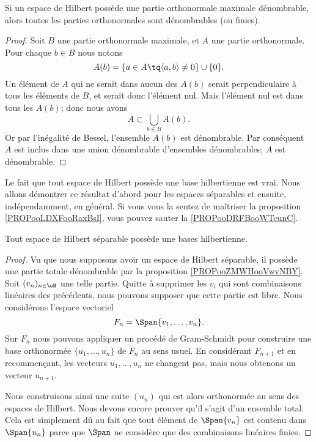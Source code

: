 \begin{proposition}      \label{PROPooENTIooIplRAS}
    Si un espace de Hilbert possède une partie orthonormale maximale dénombrable, alors toutes les parties orthonormales sont dénombrables (ou finies).
\end{proposition}

\begin{proof}
    Soit \( B\) une partie orthonormale maximale, et \( A\) une partie orthonormale. Pour chaque \( b\in B\) nous notons
    \begin{equation}
        A(b)=\{ a\in A\tq \langle a, b\rangle \neq 0 \}\cup\{ 0 \}.
    \end{equation}
    Un élément de \( A\) qui ne serait dans aucun des \( A(b)\) serait perpendiculaire à tous les éléments de \( B\), et serait donc l'élément nul. Mais l'élément nul est dans tous les \( A(b)\); donc nous avons
    \begin{equation}
        A\subset\bigcup_{b\in B}A(b).
    \end{equation}
    Or par l'inégalité de Bessel, l'ensemble \( A(b)\) est dénombrable. Par conséquent \( A\) est inclus dans une union dénombrable d'ensembles dénombrables; \( A\) est dénombrable.
\end{proof}

Le fait que tout espace de Hilbert possède une base hilbertienne est vrai. Nous allons démontrer ce résultat d'abord pour les espaces séparables et ensuite, indépendamment, en général. Si vous vous la sentez de maîtriser la proposition \ref{PROPooLDXFooRaxBsI}, vous pouvez sauter la \ref{PROPooDRFBooWTcunC}.
\begin{proposition}     \label{PROPooDRFBooWTcunC}
    Tout espace de Hilbert séparable possède une bases hilbertienne.
\end{proposition}

\begin{proof}
    Vu que nous supposons avoir un espace de Hilbert séparable, il possède une partie totale dénombrable par la proposition \ref{PROPooZMWHooVwvNBY}. Soit  \( (v_n)_{n\in \eN}\) une telle partie. Quitte à supprimer les \( v_i\) qui sont combinaisons linéaires des précédents, nous pouvons supposer que cette partie est libre. Nous considérons l'espace vectoriel
    \begin{equation}
        F_n=\Span\{ v_1,\ldots, v_n \}.
    \end{equation}
    Sur \( F_n\) nous pouvons appliquer un procédé de Gram-Schmidt pour construire une base orthonormée \( \{ u_1,\ldots, u_n \}\) de \( F_n\) au sens usuel. En considérant \( F_{n+1}\) et en recommençant, les vecteurs \( u_1,\ldots, u_n\) ne changent pas, mais nous obtenons un vecteur \( u_{n+1}\).

    Nous construisons ainsi une suite \( (u_n)\) qui est alors orthonormée au sens des espaces de Hilbert. Nous devons encore prouver qu'il s'agit d'un ensemble total. Cela est simplement dû au fait que tout élément de \( \Span\{ v_n \}\) est contenu dans \( \Span\{ u_n \}\) parce que \( \Span\) ne considère que des combinaisons linéaires finies.
\end{proof}

